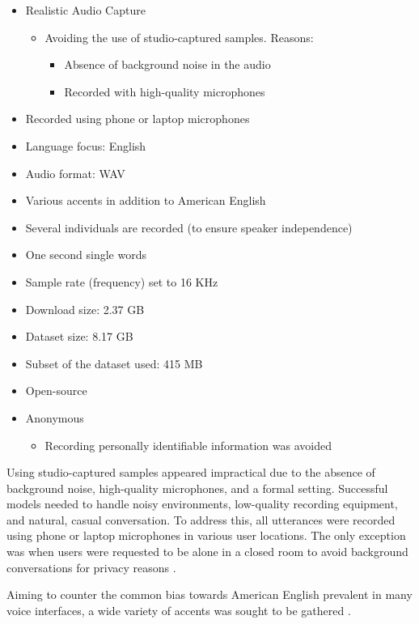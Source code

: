\begin{itemize}
	\item Realistic Audio Capture
	
	\begin{itemize}
		\item Avoiding the use of studio-captured samples. Reasons:
		\begin{itemize}
			\item Absence of background noise in the audio
			\item Recorded with high-quality microphones
		\end{itemize}
	\end{itemize}
	
	\item Recorded using phone or laptop microphones
	\item Language focus: English
	\item Audio format: WAV
	\item Various accents in addition to American English
	\item Several individuals are recorded (to ensure speaker independence)
	\item One second single words
	\item Sample rate (frequency) set to 16 KHz
	\item Download size: 2.37 GB
	\item Dataset size: 8.17 GB
	\item Subset of the dataset used: 415 MB
	\item Open-source
	\item Anonymous
	\begin{itemize}
		\item Recording personally identifiable information was avoided
	\end{itemize}
\end{itemize}

Using studio-captured samples appeared impractical due to the absence of background noise, high-quality microphones, and a formal setting. Successful models needed to handle noisy environments, low-quality recording equipment, and natural, casual conversation. To address this, all utterances were recorded using phone or laptop microphones in various user locations. The only exception was when users were requested to be alone in a closed room to avoid background conversations for privacy reasons \cite{Warden:2018}.

Aiming to counter the common bias towards American English prevalent in many voice interfaces, a wide variety of accents was sought to be gathered \cite{Warden:2018}.

